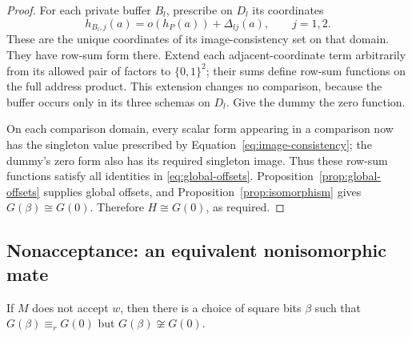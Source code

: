 \begin{proof}
For each private buffer \(B_l\), prescribe on \(D_l\) its coordinates
\[
 h_{B_l,j}(a)=o(h_P(a))+\Delta_{lj}(a),\qquad j=1,2.
\]
These are the unique coordinates of its image-consistency set on that domain.
They have row-sum form there.  Extend each adjacent-coordinate term arbitrarily
from its allowed pair of factors to \(\{0,1\}^2\); their sums define row-sum
functions on the full address product.  This extension changes no comparison,
because the buffer occurs only in its three schemas on \(D_l\).  Give the
dummy the zero function.

On each comparison domain, every scalar form appearing in a comparison now has
the singleton value prescribed by Equation~\eqref{eq:image-consistency}; the
dummy's zero form also has its required singleton image.  Thus these row-sum
functions satisfy all identities in
\eqref{eq:global-offsets}.  Proposition~\ref{prop:global-offsets} supplies
global offsets, and Proposition~\ref{prop:isomorphism} gives
\(G(\beta)\cong G(0)\).  Therefore \(H\cong G(0)\), as required.
\end{proof}

\subsection{Nonacceptance: an equivalent nonisomorphic mate}

\begin{proposition}
\label{prop:rejection}
If \(M\) does not accept \(w\), then there is a choice of square bits
\(\beta\) such that \(G(\beta)\equiv_r G(0)\) but
\(G(\beta)\not\cong G(0)\).
\end{proposition}

